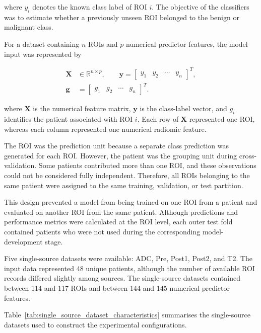 \documentclass[12pt,twocolumn]{article}
\begin{document}
where \(y_i\) denotes the known class label of ROI \(i\). The objective
of the classifiers was to estimate whether a previously unseen ROI
belonged to the benign or malignant class.

For a dataset containing \(n\) ROIs and \(p\) numerical predictor
features, the model input was represented by


\begin{equation}
\begin{aligned}
\mathbf{X} &\in \mathbb{R}^{n \times p},
\qquad
\mathbf{y} =
\begin{bmatrix}
y_1 & y_2 & \cdots & y_n
\end{bmatrix}^{T},
\\[4pt]
\mathbf{g} &=
\begin{bmatrix}
g_1 & g_2 & \cdots & g_n
\end{bmatrix}^{T}.
\end{aligned}
\label{eq:data_representation}
\end{equation}



where \(\mathbf{X}\) is the numerical feature matrix,
\(\mathbf{y}\) is the class-label vector, and \(g_i\) identifies the
patient associated with ROI \(i\). Each row of \(\mathbf{X}\)
represented one ROI, whereas each column represented one numerical
radiomic feature.

The ROI was the prediction unit because a separate class prediction
was generated for each ROI. However, the patient was the grouping
unit during cross-validation. Some patients contributed more than
one ROI, and these observations could not be considered fully
independent. Therefore, all ROIs belonging to the same patient were
assigned to the same training, validation, or test partition.

This design prevented a model from being trained on one ROI from a
patient and evaluated on another ROI from the same patient. Although
predictions and performance metrics were calculated at the ROI level,
each outer test fold contained patients who were not used during the
corresponding model-development stage.

Five single-source datasets were available: ADC, Pre, Post1, Post2,
and T2. The input data represented 48 unique patients, although the
number of available ROI records differed slightly among sources.
The single-source datasets contained between 114 and 117 ROIs and
between 144 and 145 numerical predictor features.

Table~\ref{tab:single_source_dataset_characteristics} summarises the
single-source datasets used to construct the experimental
configurations.
\end{document}
